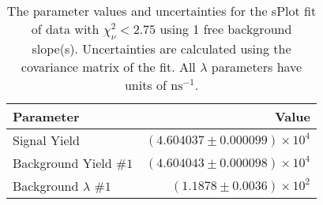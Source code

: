 
\begin{table}
    \begin{center}
        \begin{tabular}{lr}\toprule
            Parameter & Value \\\midrule
            Signal Yield & $(4.604037 \pm 0.000099) \times 10^{4}$ \\
            Background Yield $\#1$ & $(4.604043 \pm 0.000098) \times 10^{4}$ \\
            Background $\lambda$ $\#1$ & $(1.1878 \pm 0.0036) \times 10^{2}$ \\\bottomrule
        \end{tabular}
        \caption{The parameter values and uncertainties for the sPlot fit of data with $\chi^2_\nu < 2.75$ using 1 free background slope(s). Uncertainties are calculated using the covariance matrix of the fit. All $\lambda$ parameters have units of $\si{\nano\second}^{-1}$.}
    \end{center}
\end{table}
